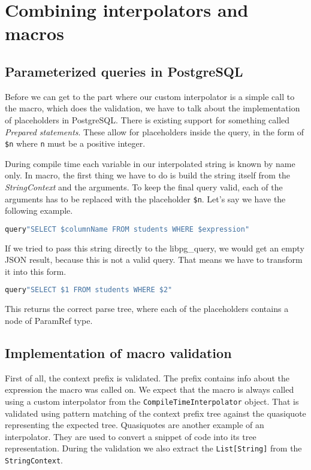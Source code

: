 \section{Combining interpolators and macros}
\subsection{Parameterized queries in PostgreSQL}
Before we can get to the part where our custom interpolator is a simple call to the macro, which does the validation, we have to talk about the implementation of placeholders in PostgreSQL. There is existing support for something called \textit{Prepared statements}. These allow for placeholders inside the query, in the form of \texttt{\$n} where \texttt{n} must be a positive integer.  

During compile time each variable in our interpolated string is known by name only. In macro, the first thing we have to do is build the string itself from the \textit{StringContext} and the arguments. To keep the final query valid, each of the arguments has to be replaced with the placeholder \texttt{\$n}. 
Let's say we have the following example.
\begin{lstlisting}[language=scala, basicstyle=\ttfamily, showstringspaces=false]
query"SELECT $columnName FROM students WHERE $expression"
\end{lstlisting}
If we tried to pass this string directly to the libpg\_query, we would get an empty JSON result, because this is not a valid query. That means we have to transform it into this form.
\begin{lstlisting}[language=scala, basicstyle=\ttfamily, showstringspaces=false]
query"SELECT $1 FROM students WHERE $2"
\end{lstlisting}
This returns the correct parse tree, where each of the placeholders contains a node of ParamRef type. 

\subsection{Implementation of macro validation}
First of all, the context prefix is validated. The prefix contains info about the expression the macro was called on. We expect that the macro is always called using a custom interpolator from the \texttt{CompileTimeInterpolator} object. That is validated using pattern matching of the context prefix tree against the quasiquote representing the expected tree. Quasiquotes are another example of an interpolator. They are used to convert a snippet of code into its tree representation.\cite{quasiquotes} During the validation we also extract the \texttt{List[String]} from the \texttt{StringContext}.

